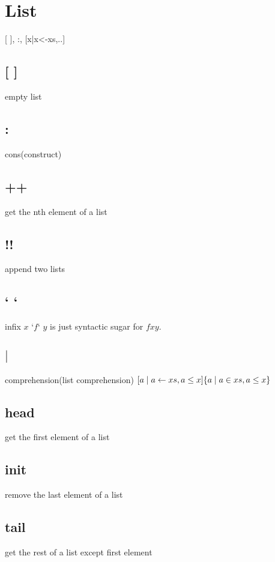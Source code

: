 \documentclass[a4paper,12pt]{article}
\theoremstyle{definition}
\begin{document}
\section{List} [ ], :, [x|x<-xs,..]

\subsection{[ ]} empty list 

\subsection*{:} cons(construct)

\subsection*{++} get the nth element of a list 

\subsection*{!!}

append two lists

\subsection*{` `}

infix 
$x$ `$f$` $y$ is just syntactic sugar for $f x y$. 

\subsection*{$\mid$} comprehension(list comprehension) 
$[a \mid a \leftarrow xs, a \leq x] \\ \{ a \mid a \in xs, a \leq x\}$

\subsection*{head} get the first element of a list

\subsection*{init} remove the last element of a list

\subsection*{tail} get the rest of a list except first element
\end{document}
